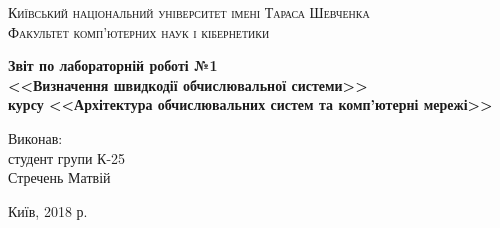 \begin{titlepage}
\begin{center}
\textsc{Київський національний університет імені Тараса Шевченка\\[5mm]
Факультет комп'ютерних наук і кібернетики}

\vfill

\textbf{Звіт по лабораторній роботі №1 \\[3mm]
<<Визначення швидкодії обчислювальної системи>> \\[3mm]
курсу <<Архітектура обчислювальних систем та комп'ютерні мережі>>\\[20mm]
}
\end{center}

\vfill
\hfill
\begin{minipage}{.25\textwidth}
Виконав:\\[2mm]
студент групи К-25\\
Стречень Матвій\\[5mm]

\end{minipage}%



\begin{center}
    Київ, 2018 р.
\end{center}
\end{titlepage}
